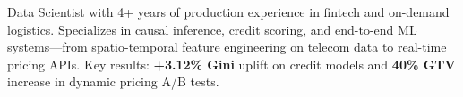 Data Scientist with 4+ years of production experience in fintech and on-demand logistics. Specializes in causal inference, credit scoring, and end-to-end ML systems---from spatio-temporal feature engineering on telecom data to real-time pricing APIs. Key results: \textbf{+3.12\% Gini} uplift on credit models and \textbf{40\% GTV} increase in dynamic pricing A/B tests.


